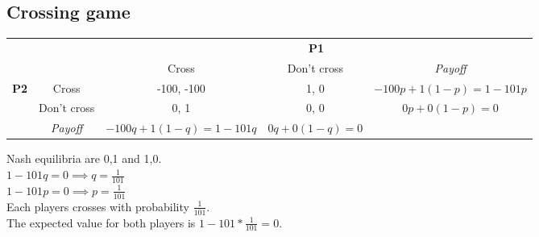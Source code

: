 \documentclass{article}
\begin{document}
\subsection{Crossing game}
\begin{center}
\begin{tabular}{ccccc}
                                                        &                                      & \multicolumn{3}{c}{\textbf{P1}}                                                                                              \\ \cline{3-5} 
                                                        & \multicolumn{1}{c|}{}                & \multicolumn{1}{c|}{Cross}                   & \multicolumn{1}{c|}{Don't cross}     & \multicolumn{1}{c|}{\textit{Payoff}}         \\ \cline{2-5} 
\multicolumn{1}{c|}{\multirow{3}{*}{\textbf{P2}}} & \multicolumn{1}{c|}{Cross}           & \multicolumn{1}{c|}{-100, -100}              & \multicolumn{1}{c|}{1, 0}            & \multicolumn{1}{c|}{$-100p+1(1-p) = 1-101p$} \\ \cline{2-5} 
\multicolumn{1}{c|}{}                                   & \multicolumn{1}{c|}{Don't cross}     & \multicolumn{1}{c|}{0, 1}                    & \multicolumn{1}{c|}{0, 0}            & \multicolumn{1}{c|}{$0p+0(1-p) = 0$}         \\ \cline{2-5} 
\multicolumn{1}{c|}{}                                   & \multicolumn{1}{c|}{\textit{Payoff}} & \multicolumn{1}{c|}{$-100q+1(1-q) = 1-101q$} & \multicolumn{1}{c|}{$0q+0(1-q) = 0$} & \multicolumn{1}{c|}{}                        \\ \cline{2-5} 
\end{tabular}                 
\end{center}
Nash equilibria are 0,1 and 1,0.\\
$1-101q=0 \implies q=\frac{1}{101}$\\
$1-101p=0 \implies p=\frac{1}{101}$\\
Each players crosses with probability $\frac{1}{101}$.\\
The expected value for both players is  $1-101*\frac{1}{101}=0$.
\end{document}
